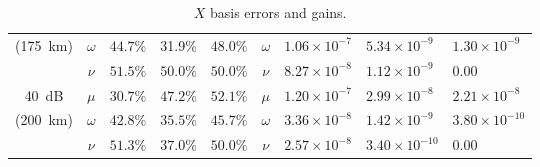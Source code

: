 \begin{table}[htbp]
\begin{tabular}{cclllclll}
(\SI{175}{\km}) & $\omega$        & $44.7\%$                  & 31.9\%                  & $48.0\%$                  & $\omega$        & $1.06\times10^{-7}$     & $5.34\times10^{-9}$     & $1.30\times10^{-9}$\\
        & $\nu$        & $51.5\%$                  & $50.0\%$                  & $50.0\%$                  & $\nu$        & $8.27\times10^{-8}$     & $1.12\times10^{-9}$     & $0.00$     \vspace{5pt}\\
\SI{40}{dB} & $\mu$        & $30.7\%$                  & $47.2\%$                  & $52.1\%$                  & $\mu$        & $1.20\times10^{-7}$     & $2.99\times10^{-8}$     & $2.21\times10^{-8}$     \\
(\SI{200}{\km}) & $\omega$        & $42.8\%$                  & $35.5\%$                  & $45.7\%$                  & $\omega$        & $3.36\times10^{-8}$     & $1.42\times10^{-9}$     & $3.80\times10^{-10}$    \\
        & $\nu$        & $51.3\%$                  & $37.0\%$                  & $50.0\%$                  & $\nu$        & $2.57\times10^{-8}$     & $3.40\times10^{-10}$    & $0.00$                 
\end{tabular}
\caption{$X$ basis errors and gains.}
\end{table}


